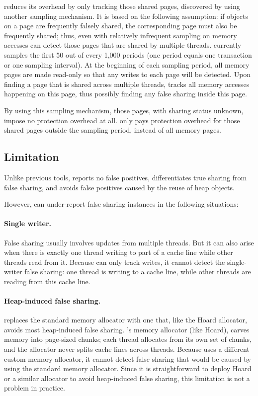 \SheriffDetect{} reduces its overhead by only tracking those shared pages, discovered by using another sampling mechanism. It is based on the following assumption: if objects on a page are frequently falsely shared, the corresponding page must also be frequently shared; thus, even with relatively infrequent sampling on memory accesses can detect those pages that are shared by multiple threads.  \SheriffDetect{} currently samples the first 50 out of every 1,000 periods (one period equals one transaction or one sampling interval). At the beginning of each sampling period, all memory pages are made read-only so that any
writes to each page will be detected. Upon finding a page that is shared across multiple threads, \SheriffDetect{} tracks all memory accesses happening on this page, thus possibly finding any false sharing inside this page. 

By using this sampling mechanism, those pages, with sharing status unknown, impose no protection overhead at all. \sheriffDetect{} only pays protection overhead for those shared pages outside the sampling period, instead of all memory pages. 

\subsection{Limitation}
\label{discussion:faultofdetect}

Unlike previous tools, \SheriffDetect{} reports no false positives, differentiates true sharing from false sharing, and avoids false positives caused by the reuse of heap objects. 

However, \SheriffDetect{} can under-report false sharing instances in the following situations:

\paragraph{Single writer.}
False sharing usually involves updates from multiple threads. But it can also arise when there is exactly one thread writing to part of a cache line while other threads read from it. Because \sheriffdetect{} can only track writes, it cannot detect the single-writer false sharing: one thread is writing to a cache line, while other threads are reading from this cache line. 

\paragraph{Heap-induced false sharing.}  
\sheriff{} replaces the standard memory allocator with one that, like the Hoard allocator, avoids most heap-induced false sharing. \sheriff{}'s memory allocator (like Hoard), carves memory into page-sized chunks; each thread allocates from its own set of chunks, and the allocator never splits cache lines across threads. Because \SheriffDetect{} uses a different custom memory allocator, it cannot detect false sharing that would be caused by using the standard memory allocator. Since it is straightforward to deploy Hoard or a similar allocator to avoid heap-induced false sharing, this limitation is not a problem in practice.

